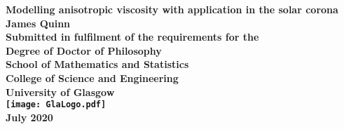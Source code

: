 \documentclass[12pt,titlepage,oneside]{book}
\begin{document}
\begin{titlepage}
\centering
\vspace*{3cm}  %
\bfseries\Large
Modelling anisotropic viscosity with application in the solar corona\\
\vspace{3cm}
\normalfont\large
James Quinn\\
\vspace{2cm}
Submitted in fulfilment of the requirements for the\\
Degree of Doctor of Philosophy\\
\vspace{2cm}
School of Mathematics and Statistics\\
College of Science and Engineering\\
University of Glasgow\\
\vspace{1cm}
\texttt{[image: GlaLogo.pdf]}
\\
\vspace{1cm}
July 2020
\end{titlepage}
\frontmatter  %



\tableofcontents
\listoftables
\listoffigures




\mainmatter %
\listoftodos







\appendix


\backmatter  %
\printbibliography
\end{document}
